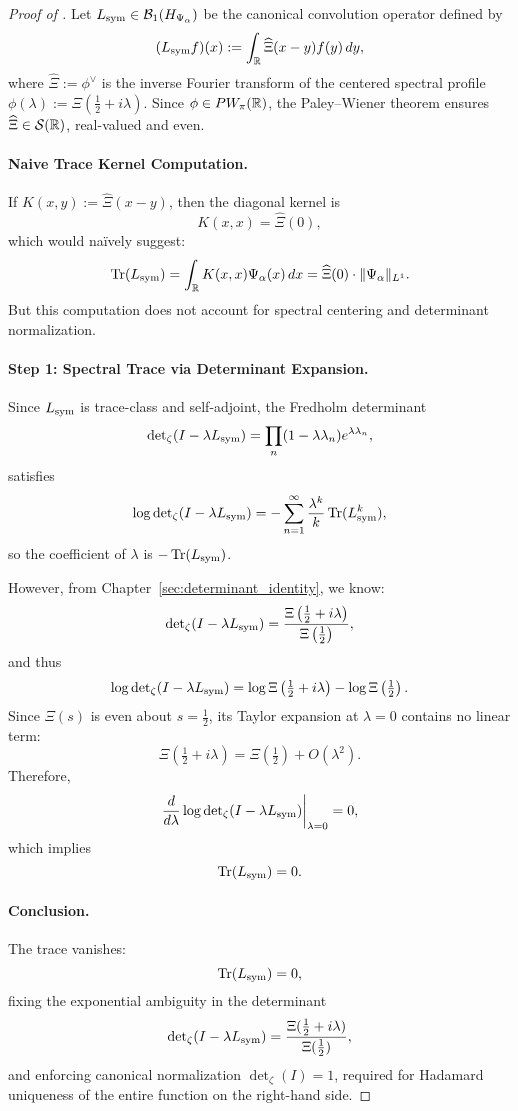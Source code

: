 \begin{proof}[Proof of ]
Let \( L_{\mathrm{sym}} \in \mathcal{B}_1(H_{\Psi_\alpha}) \) be the canonical convolution operator defined by
\[
(L_{\mathrm{sym}} f)(x) := \int_{\mathbb{R}} \widehat{\Xi}(x - y) f(y)\, dy,
\]
where \( \widehat{\Xi} := \phi^\vee \) is the inverse Fourier transform of the centered spectral profile \( \phi(\lambda) := \Xi\left( \tfrac{1}{2} + i\lambda \right) \). Since \( \phi \in PW_\pi(\mathbb{R}) \), the Paley–Wiener theorem ensures \( \widehat{\Xi} \in \mathcal{S}(\mathbb{R}) \), real-valued and even.

\paragraph{Naive Trace Kernel Computation.}
If \( K(x, y) := \widehat{\Xi}(x - y) \), then the diagonal kernel is
\[
K(x, x) = \widehat{\Xi}(0),
\]
which would naïvely suggest:
\[
\operatorname{Tr}(L_{\mathrm{sym}}) = \int_{\mathbb{R}} K(x, x) \Psi_\alpha(x)\, dx = \widehat{\Xi}(0) \cdot \|\Psi_\alpha\|_{L^1}.
\]
But this computation does not account for spectral centering and determinant normalization.

\paragraph{Step 1: Spectral Trace via Determinant Expansion.}
Since \( L_{\mathrm{sym}} \) is trace-class and self-adjoint, the Fredholm determinant
\[
\det\nolimits_\zeta(I - \lambda L_{\mathrm{sym}}) = \prod_{n}(1 - \lambda \lambda_n) e^{\lambda \lambda_n},
\]
satisfies
\[
\log \det\nolimits_\zeta(I - \lambda L_{\mathrm{sym}}) = -\sum_{n=1}^\infty \frac{\lambda^k}{k} \operatorname{Tr}(L_{\mathrm{sym}}^k),
\]
so the coefficient of \( \lambda \) is \( -\operatorname{Tr}(L_{\mathrm{sym}}) \).

However, from Chapter~\ref{sec:determinant_identity}, we know:
\[
\det\nolimits_\zeta(I - \lambda L_{\mathrm{sym}}) = \frac{\Xi\left( \tfrac{1}{2} + i\lambda \right)}{\Xi\left( \tfrac{1}{2} \right)},
\]
and thus
\[
\log \det\nolimits_\zeta(I - \lambda L_{\mathrm{sym}}) = \log \Xi\left( \tfrac{1}{2} + i\lambda \right) - \log \Xi\left( \tfrac{1}{2} \right).
\]
Since \( \Xi(s) \) is even about \( s = \tfrac{1}{2} \), its Taylor expansion at \( \lambda = 0 \) contains no linear term:
\[
\Xi\left( \tfrac{1}{2} + i\lambda \right) = \Xi\left( \tfrac{1}{2} \right) + O(\lambda^2).
\]
Therefore,
\[
\frac{d}{d\lambda} \log \det\nolimits_\zeta(I - \lambda L_{\mathrm{sym}}) \bigg|_{\lambda = 0} = 0,
\]
which implies
\[
\operatorname{Tr}(L_{\mathrm{sym}}) = 0.
\]

\paragraph{Conclusion.}
The trace vanishes:
\[
\operatorname{Tr}(L_{\mathrm{sym}}) = 0,
\]
fixing the exponential ambiguity in the determinant
\[
\det\nolimits_\zeta(I - \lambda L_{\mathrm{sym}}) = \frac{\Xi(\tfrac{1}{2} + i\lambda)}{\Xi(\tfrac{1}{2})},
\]
and enforcing canonical normalization \( \det\nolimits_\zeta(I) = 1 \), required for Hadamard uniqueness of the entire function on the right-hand side.
\end{proof}
